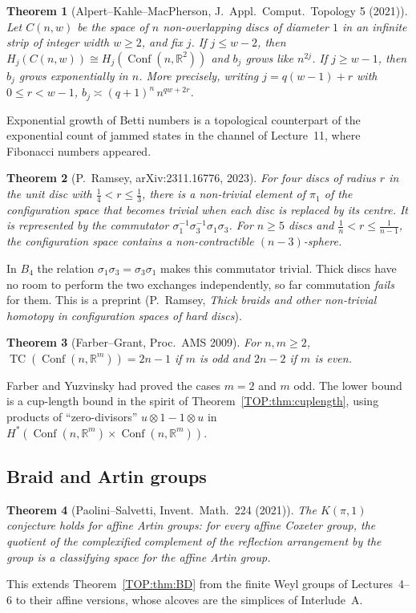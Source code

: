 \documentclass[11pt,openany]{book}
\theoremstyle{plain}
\newtheorem{theorem}{Theorem}[chapter]
\theoremstyle{definition}
\theoremstyle{remark}
\newcommand{\R}{\mathbb{R}}
\newcommand{\Conf}{\operatorname{Conf}}
\begin{document}
\begin{theorem}[Alpert--Kahle--MacPherson, J.\ Appl.\ Comput.\ Topology 5 (2021)]\label{TOP:thm:AKM}
Let $C(n,w)$ be the space of $n$ non-overlapping discs of diameter $1$ in an infinite strip of integer width $w\ge2$, and fix
$j$. If $j\le w-2$, then $H_j(C(n,w))\cong H_j(\Conf(n,\R^2))$ and $b_j$ grows like $n^{2j}$. If $j\ge w-1$,
then $b_j$ grows exponentially in $n$. More precisely, writing $j=q(w-1)+r$ with $0\le r<w-1$,
$b_j\asymp(q+1)^n\,n^{qw+2r}$.
\end{theorem}
\noindent Exponential growth of Betti numbers is a topological counterpart of the exponential count of
jammed states in the channel of Lecture~11, where Fibonacci numbers appeared.

\begin{theorem}[P.~Ramsey, arXiv:2311.16776, 2023]\label{TOP:thm:thick}
For four discs of radius $r$ in the unit disc with $\tfrac14<r\le\tfrac13$, there is a non-trivial
element of $\pi_1$ of the configuration space that becomes trivial when each disc is replaced by its centre.
It is represented by the commutator $\sigma_1^{-1}\sigma_3^{-1}\sigma_1\sigma_3$. For $n\ge5$ discs and
$\tfrac1n<r\le\tfrac1{n-1}$, the configuration space contains a non-contractible $(n-3)$-sphere.
\end{theorem}
\noindent In $B_4$ the relation $\sigma_1\sigma_3=\sigma_3\sigma_1$ makes this commutator trivial. Thick discs have
no room to perform the two exchanges independently, so far commutation \emph{fails} for them. This is a preprint (P.~Ramsey, \emph{Thick braids and other
non-trivial homotopy in configuration spaces of hard discs}).

\begin{theorem}[Farber--Grant, Proc.\ AMS 2009]\label{TOP:thm:farber}
For $n,m\ge2$, $\operatorname{TC}(\Conf(n,\R^m))=2n-1$ if $m$ is odd and $2n-2$ if $m$ is even.
\end{theorem}
\noindent Farber and Yuzvinsky had proved the cases $m=2$ and $m$ odd. The lower bound is a cup-length bound in the spirit of
Theorem~\ref{TOP:thm:cuplength}, using products of ``zero-divisors'' $u\otimes1-1\otimes u$ in
$H^*(\Conf(n,\R^m)\times\Conf(n,\R^m))$.

\subsection*{Braid and Artin groups}

\begin{theorem}[Paolini--Salvetti, Invent.\ Math.\ 224 (2021)]\label{TOP:thm:PS}
The $K(\pi,1)$ conjecture holds for affine Artin groups: for every affine Coxeter group, the quotient of the
complexified complement of the reflection arrangement by the group is a classifying space for the
affine Artin group.
\end{theorem}
\noindent This extends Theorem~\ref{TOP:thm:BD} from the finite Weyl groups of Lectures~4--6 to their affine
versions, whose alcoves are the simplices of Interlude~A.
\end{document}
